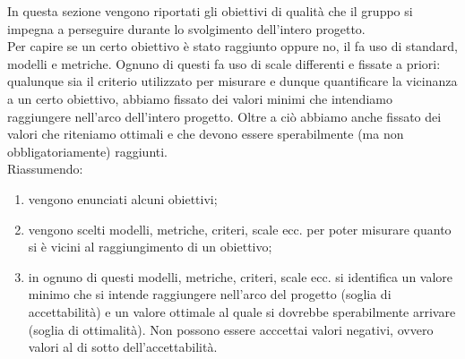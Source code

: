 		In questa sezione vengono riportati gli obiettivi di qualità che il gruppo \groupname{} si impegna a perseguire durante lo svolgimento dell'intero progetto.\\
		Per capire se un certo obiettivo è stato raggiunto oppure no, il \groupname{} fa uso di standard, modelli e metriche. Ognuno di questi fa uso di scale differenti e fissate a priori: qualunque sia il criterio utilizzato per misurare e dunque quantificare la vicinanza a un certo obiettivo, abbiamo fissato dei valori minimi che intendiamo raggiungere nell'arco dell'intero progetto. Oltre a ciò abbiamo anche fissato dei valori che riteniamo ottimali e che devono essere sperabilmente (ma non obbligatoriamente) raggiunti.\\
		Riassumendo:
		\begin{enumerate}
			\item vengono enunciati alcuni obiettivi;
			\item vengono scelti modelli, metriche, criteri, scale ecc. per poter misurare quanto si è vicini al raggiungimento di un obiettivo;
			\item in ognuno di questi modelli, metriche, criteri, scale ecc. si identifica un valore minimo che si intende raggiungere nell'arco del progetto (soglia di accettabilità) e un valore ottimale al quale si dovrebbe sperabilmente arrivare (soglia di ottimalità). Non possono essere acccettai valori negativi, ovvero valori al di sotto dell'accettabilità. 
		\end{enumerate}

